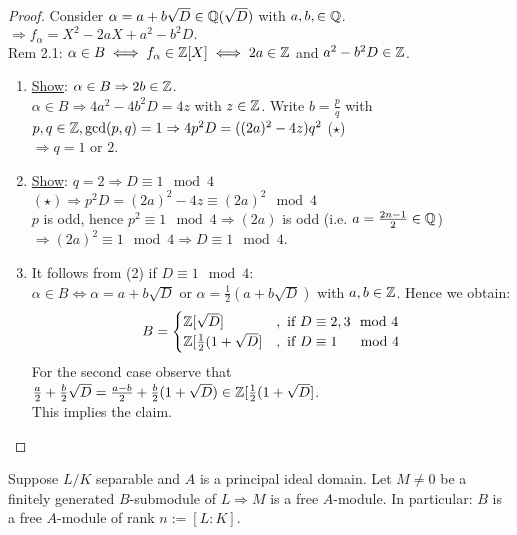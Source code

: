 \begin{proof}
Consider $\alpha = a+b \sqrt{D} \in \mathbb{Q}(\sqrt{D})$ with $a,b, \in \mathbb{Q}$.\\
$\Rightarrow f_\alpha = X^2-2aX+a^2-b^2D.$\\
Rem 2.1: $\alpha \in B \iff f_\alpha \in \mathbb{Z}[X] \iff 2a \in \mathbb{Z}$ and $a^2-b^2D \in \mathbb{Z}$.
\begin{enumerate}[(1)]
\item \underline{Show}: $\alpha \in B \Rightarrow 2b \in \mathbb{Z}$.\\
$\alpha \in B \Rightarrow 4a^2-4b^2D = 4z$ with $z \in \mathbb{Z}$. Write $b= \frac{p}{q}$ with $p,q \in \mathbb{Z}, \gcd(p,q) =1 \\
\Rightarrow 4p^2D=((2a)^2-4z)q^2$ \quad ($\star$)\\
$\Rightarrow q=1 $ or $2$.
\item \underline{Show}: $q=2 \Rightarrow D \equiv 1 \mod 4$\\
$(\star) \Rightarrow p^2D= (2a)^2 -4z \equiv (2a)^2 \mod 4$\\
$p$ is odd, hence $p^2 \equiv 1 \mod 4 \Rightarrow (2a)$ is odd (i.e. $a=\frac{2n-1}{2} \in \mathbb{Q}$)\\ $\Rightarrow (2a)^2 \equiv 1 \mod 4 \Rightarrow D \equiv 1 \mod 4$.
\item It follows from (2) if $D \equiv 1 \mod 4$:\\
$\alpha \in B \iff \alpha = a +b \sqrt{D}$ or $\alpha = \frac{1}{2}(a +b \sqrt{D})$ with $a,b \in \mathbb{Z}$. Hence we obtain:
\begin{align*}
B= \begin{cases}
\mathbb{Z}[\sqrt{D}] &, \text{ if } D \equiv 2,3 \mod 4\\
\mathbb{Z}[\frac{1}{2}(1+ \sqrt{D}] &, \text{ if } D \equiv 1 \quad \mod 4
\end{cases}
\end{align*}
For the second case observe that $\frac{a}{2} + \frac{b}{2} \sqrt{D} = \frac{a-b}{2} + \frac{b}{2} (1+ \sqrt{D}) \in \mathbb{Z}[\frac{1}{2}(1+ \sqrt{D}]$.\\
 This implies the claim.
\end{enumerate}
\end{proof}

\begin{Prop}
Suppose $L/K$ separable and $A$ is a principal ideal domain. Let $M \not = 0$ be a finitely generated $B$-submodule of $L \Rightarrow M$ is a free $A$-module. In particular: $B$ is a free $A$-module of rank $n:=[L:K]$.
\end{Prop}

